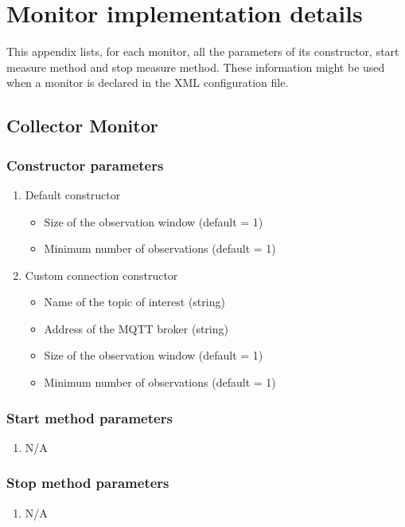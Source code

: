 \section{Monitor implementation details}
\label{appendix:monitor_implementation}

This appendix lists, for each monitor, all the parameters of its constructor, start measure method and stop measure method.
These information might be used when a monitor is declared in the XML configuration file.



\subsection{Collector Monitor}

\subsubsection*{Constructor parameters}
\begin{enumerate}
	\item Default constructor
		\begin{itemize}
			\item Size of the observation window (default = 1)
			\item Minimum number of observations (default = 1)
		\end{itemize}
	\item Custom connection constructor
		\begin{itemize}
			\item Name of the topic of interest (string)
			\item Address of the MQTT broker (string)
			\item Size of the observation window (default = 1)
			\item Minimum number of observations (default = 1)
		\end{itemize}
\end{enumerate}

\subsubsection*{Start method parameters}
\begin{enumerate}
	\item[] N/A
\end{enumerate}


\subsubsection*{Stop method parameters}
\begin{enumerate}
	\item[] N/A
\end{enumerate}






